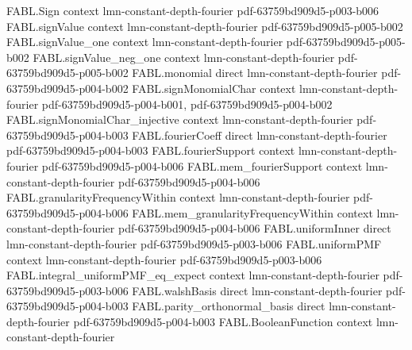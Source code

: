 \begin{theorem}
\label{FABL.FiniteFourierBasis.orthogonalWeightAtDegree_eq_sum_sq_fourierCoeff}
\leanok
{}
\proofstep
  {FABL.Sign}
  {context}
  {lmn-constant-depth-fourier}
  {pdf-63759bd909d5-p003-b006}
\proofstep
  {FABL.signValue}
  {context}
  {lmn-constant-depth-fourier}
  {pdf-63759bd909d5-p005-b002}
\proofstep
  {FABL.signValue_one}
  {context}
  {lmn-constant-depth-fourier}
  {pdf-63759bd909d5-p005-b002}
\proofstep
  {FABL.signValue_neg_one}
  {context}
  {lmn-constant-depth-fourier}
  {pdf-63759bd909d5-p005-b002}
\proofstep
  {FABL.monomial}
  {direct}
  {lmn-constant-depth-fourier}
  {pdf-63759bd909d5-p004-b002}
\proofstep
  {FABL.signMonomialChar}
  {context}
  {lmn-constant-depth-fourier}
  {pdf-63759bd909d5-p004-b001,
    pdf-63759bd909d5-p004-b002}
\proofstep
  {FABL.signMonomialChar_injective}
  {context}
  {lmn-constant-depth-fourier}
  {pdf-63759bd909d5-p004-b003}
\proofstep
  {FABL.fourierCoeff}
  {direct}
  {lmn-constant-depth-fourier}
  {pdf-63759bd909d5-p004-b003}
\proofstep
  {FABL.fourierSupport}
  {context}
  {lmn-constant-depth-fourier}
  {pdf-63759bd909d5-p004-b006}
\proofstep
  {FABL.mem_fourierSupport}
  {context}
  {lmn-constant-depth-fourier}
  {pdf-63759bd909d5-p004-b006}
\proofstep
  {FABL.granularityFrequencyWithin}
  {context}
  {lmn-constant-depth-fourier}
  {pdf-63759bd909d5-p004-b006}
\proofstep
  {FABL.mem_granularityFrequencyWithin}
  {context}
  {lmn-constant-depth-fourier}
  {pdf-63759bd909d5-p004-b006}
\proofstep
  {FABL.uniformInner}
  {direct}
  {lmn-constant-depth-fourier}
  {pdf-63759bd909d5-p003-b006}
\proofstep
  {FABL.uniformPMF}
  {context}
  {lmn-constant-depth-fourier}
  {pdf-63759bd909d5-p003-b006}
\proofstep
  {FABL.integral_uniformPMF_eq_expect}
  {context}
  {lmn-constant-depth-fourier}
  {pdf-63759bd909d5-p003-b006}
\proofstep
  {FABL.walshBasis}
  {direct}
  {lmn-constant-depth-fourier}
  {pdf-63759bd909d5-p004-b003}
\proofstep
  {FABL.parity_orthonormal_basis}
  {direct}
  {lmn-constant-depth-fourier}
  {pdf-63759bd909d5-p004-b003}
\proofstep
  {FABL.BooleanFunction}
  {context}
  {lmn-constant-depth-fourier}

\end{theorem}
